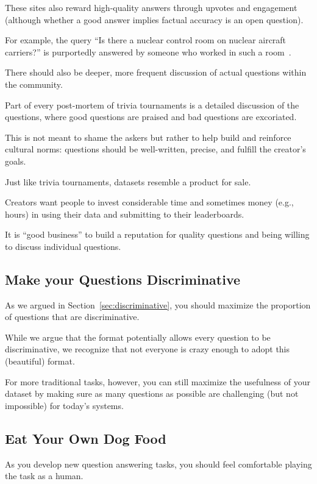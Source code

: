 These sites also reward high-quality answers through upvotes and engagement (although whether a good answer implies factual accuracy is an open question).

For example, the  query ``Is there a nuclear control room on nuclear aircraft carriers?'' is purportedly answered by someone who worked in such a room~\cite{humphries-17}.

There should also be deeper, more frequent discussion of actual questions within the  community.

Part of every post-mortem of trivia tournaments is a detailed discussion of the questions, where good questions are praised and bad questions are excoriated.

This is not meant to shame the askers but rather to help build and reinforce cultural norms: questions should be well-written, precise, and fulfill the creator's goals.

Just like trivia tournaments,  datasets resemble a product for sale.

Creators want people to invest considerable time and sometimes money (e.g.,  hours) in using their data and submitting to their leaderboards.

It is ``good business'' to build a reputation for quality questions and being willing to discuss individual questions.

\subsection{Make your Questions Discriminative}

As we argued in Section~\ref{sec:discriminative}, you should maximize the proportion of questions that are discriminative.

While we argue that the \qb{} format potentially allows every question to be discriminative, we recognize that not everyone is crazy enough to adopt this (beautiful) format.

For more traditional  tasks, however, you can still maximize the usefulness of your dataset by making sure as many questions as possible are challenging (but not impossible) for today's  systems.

\subsection{Eat Your Own Dog Food}

As you develop new question answering tasks, you should feel comfortable playing the task as a human.

